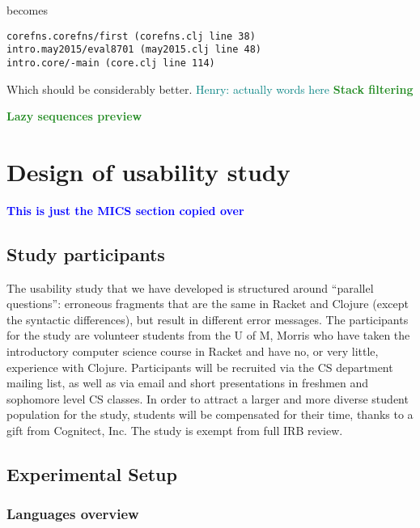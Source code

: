 \documentclass[submission,copyright,creativecommons]{eptcs}
\newcommand{\allcomments}[1]{{#1}}
\newcommand{\emcomment}[1]{{\bf \textcolor{ForestGreen}{\allcomments{{#1}}}}}
\newcommand{\hfcomment}[1]{\textcolor{Teal}{\allcomments{Henry: {#1}}}}
\newcommand{\thcomment}[1]{{\bf \textcolor{blue}{\allcomments{{#1}}}}}
\begin{document}
becomes 

\begin{verbatim}
corefns.corefns/first (corefns.clj line 38)
intro.may2015/eval8701 (may2015.clj line 48)
intro.core/-main (core.clj line 114)
\end{verbatim} 
 
Which should be considerably better.
\hfcomment{actually words here}
\emcomment{Stack filtering}

\emcomment{Lazy sequences preview}

\section{Design of usability study}\label{sec:study}
	\thcomment{This is just the MICS section copied over}
	
	\subsection{Study participants}\label{sec:obj}
The usability study that we have developed is structured around ``parallel questions'': erroneous fragments that are the same in 
Racket and Clojure (except the syntactic differences), but result in different error messages.  
The participants for the study are volunteer students from the U of M, Morris who have taken the introductory computer science course in Racket and have no, or very little, experience with Clojure.
Participants will be recruited via the CS department mailing list, as well as via email and short presentations in freshmen and sophomore level CS classes. 
In order to attract a larger and more diverse student population for the study, students will be compensated for their time, thanks to a gift from Cognitect, Inc. 
The study is exempt from full IRB review. 

	\subsection{Experimental Setup}\label{sec:setup}
	
	   


\subsubsection{Languages overview}\label{subsec:overview}
\end{document}
